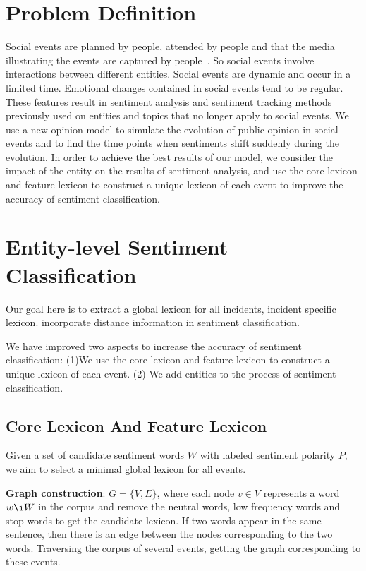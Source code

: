 \documentclass[runningheads]{llncs}
\begin{document}
\section{Problem Definition}\label{sec:problem definition}
Social events are planned by people, attended by people and that the media illustrating the events are captured by people~\cite{Papadopoulos2012SocialEvent}. So social events involve interactions between different entities. Social events are dynamic and occur in a limited time. Emotional changes contained in social events tend to be regular. These features result in sentiment analysis and sentiment tracking methods previously used on entities and topics that no longer apply to social events. We use a new opinion model to simulate the evolution of public opinion in social events and to find the time points when sentiments shift suddenly during the evolution. In order to achieve the best results of our model, we consider the impact of the entity on the results of sentiment analysis, and use the core lexicon and feature lexicon to construct a unique lexicon of each event to improve the accuracy of sentiment classification.


\section{Entity-level Sentiment Classification}\label{sec:sentiment classification}
Our goal here %
is to extract a global lexicon for all incidents, incident specific lexicon. %
incorporate distance information in sentiment classification. 

We have improved two aspects to increase the accuracy of sentiment classification:  (1)We use the core lexicon and feature lexicon to construct a unique lexicon of each event. (2) We add entities to the process of sentiment classification.
\subsection{Core Lexicon And Feature Lexicon}
Given a set of candidate sentiment words $W$ with labeled sentiment polarity $P$, we aim to select a minimal global lexicon for all events.  

\textbf{Graph construction}:  $G=\{V,E\}$, where each node $v\in V$ represents a word $w\i W$ in the corpus and remove the neutral words, low frequency words and stop words to get the candidate lexicon.  If two words appear in the same sentence, then there is an edge between the nodes corresponding to the two words. Traversing the corpus of several events, getting the graph corresponding to these events. 
\end{document}
